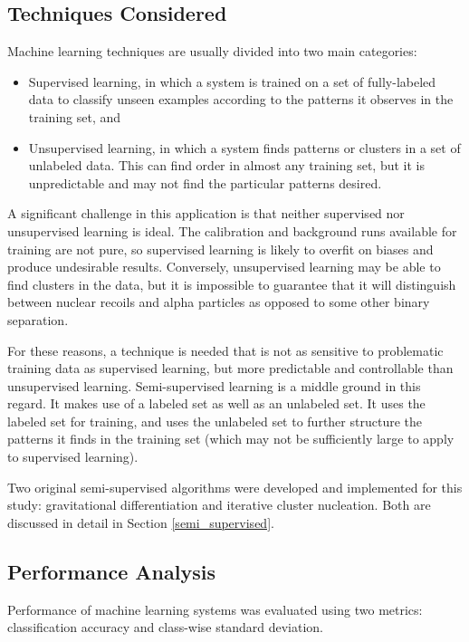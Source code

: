 \documentclass[10pt]{article}
\begin{document}
\subsection{Techniques Considered}

Machine learning techniques are usually divided into two main categories:

\begin{itemize}
    \item Supervised learning, in which a system is trained on a set of fully-labeled data to classify unseen examples according to the patterns it observes in the training set, and
    \item Unsupervised learning, in which a system finds patterns or clusters in a set of unlabeled data. This can find order in almost any training set, but it is unpredictable and may not find the particular patterns desired.
\end{itemize}

A significant challenge in this application is that neither supervised nor unsupervised learning is ideal. The calibration and background runs available for training are not pure, so supervised learning is likely to overfit on biases and produce undesirable results. Conversely, unsupervised learning may be able to find clusters in the data, but it is impossible to guarantee that it will distinguish between nuclear recoils and alpha particles as opposed to some other binary separation.

For these reasons, a technique is needed that is not as sensitive to problematic training data as supervised learning, but more predictable and controllable than unsupervised learning. Semi-supervised learning is a middle ground in this regard. It makes use of a labeled set as well as an unlabeled set. It uses the labeled set for training, and uses the unlabeled set to further structure the patterns it finds in the training set (which may not be sufficiently large to apply to supervised learning).

Two original semi-supervised algorithms were developed and implemented for this study: gravitational differentiation and iterative cluster nucleation. Both are discussed in detail in Section \ref{semi_supervised}.

\subsection{Performance Analysis}

Performance of machine learning systems was evaluated using two metrics: classification accuracy and class-wise standard deviation.
\end{document}
